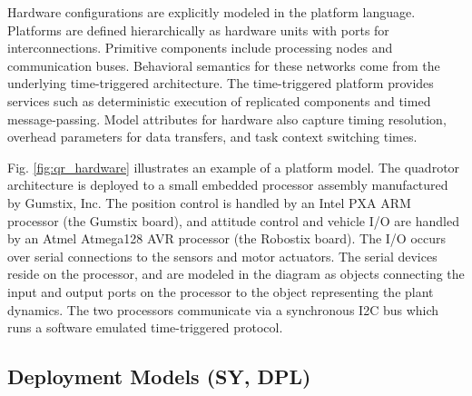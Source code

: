 Hardware configurations are explicitly modeled in the platform language.  Platforms are defined 
hierarchically as hardware units with ports for interconnections. Primitive components include processing 
nodes and communication buses.  Behavioral semantics for these networks come from the underlying 
time-triggered architecture.  The time-triggered platform provides services such as deterministic 
execution of replicated components and timed message-passing.  Model attributes for hardware also 
capture timing resolution, overhead parameters for data transfers, and task context switching times.

Fig. \ref{fig:qr_hardware} illustrates an example of a platform model.  The quadrotor architecture
is deployed to a small embedded processor assembly manufactured by Gumstix, Inc.
The position control is handled by an Intel PXA ARM processor (the Gumstix 
board), and attitude control and vehicle I/O are handled by an Atmel 
Atmega128 AVR processor (the Robostix board).  The I/O occurs over serial 
connections to the sensors and motor actuators.  The serial devices reside on
the processor, and are modeled in the diagram as objects connecting the 
input and output ports on the processor to the object representing the plant
dynamics.  The two processors communicate via a synchronous I2C bus which runs
a software emulated time-triggered protocol.

% 



\subsection{Deployment Models (SY, DPL)}


